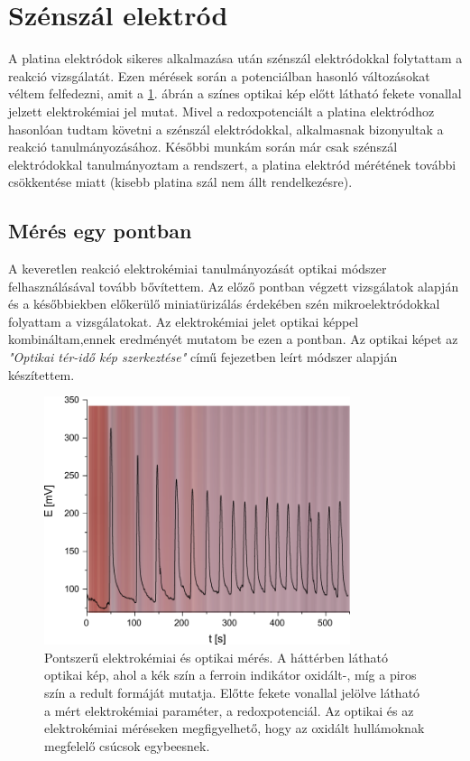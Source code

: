 \section{Szénszál elektród}
A platina elektródok sikeres alkalmazása után szénszál elektródokkal folytattam a reakció vizsgálatát. Ezen mérések során a potenciálban hasonló változásokat véltem felfedezni, amit a \ref{fig:pontszerumeres}. ábrán a színes optikai kép előtt látható fekete vonallal jelzett elektrokémiai jel mutat. Mivel a redoxpotenciált a platina elektródhoz hasonlóan tudtam követni a szénszál elektródokkal, alkalmasnak bizonyultak a reakció tanulmányozásához. Későbbi munkám során már csak szénszál elektródokkal tanulmányoztam a rendszert, a platina elektród mérétének további csökkentése miatt (kisebb platina szál nem állt rendelkezésre).
\subsection{Mérés egy pontban}
A keveretlen reakció elektrokémiai tanulmányozását optikai módszer felhasználásával tovább bővítettem. Az előző pontban végzett vizsgálatok alapján és a későbbiekben előkerülő miniatürizálás érdekében szén mikroelektródokkal folyattam a vizsgálatokat. Az elektrokémiai jelet optikai képpel kombináltam,ennek eredményét  mutatom be ezen a pontban. Az optikai képet az \emph{"Optikai tér-idő kép szerkeztése"} című fejezetben leírt módszer alapján készítettem.
\begin{figure}[h]
\centering
\includegraphics[width=0.8\textwidth]{img/pontszerumeres.png}
\caption{Pontszerű elektrokémiai és optikai mérés. A háttérben látható optikai kép, ahol a kék szín a ferroin indikátor oxidált-, míg a piros szín a redult formáját mutatja. Előtte fekete vonallal jelölve látható a mért elektrokémiai paraméter, a redoxpotenciál. Az optikai és az elektrokémiai méréseken megfigyelhető, hogy az oxidált hullámoknak megfelelő csúcsok egybeesnek.}
\label{fig:pontszerumeres}
\end{figure}

